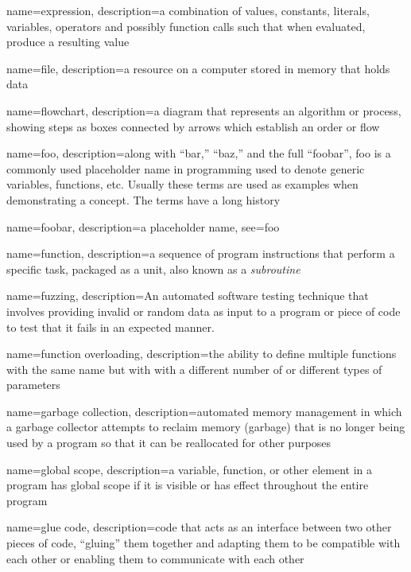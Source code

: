 {
  name=expression,
  description={a combination of values, constants, literals, variables, operators and possibly function calls such that when evaluated, produce a resulting value}
}

{
  name=file,
  description={a resource on a computer stored in memory that holds data}
}

{
  name=flowchart,
  description={a diagram that represents an algorithm or process, showing steps as boxes connected by arrows which establish an
  order or flow}
}

{
  name=foo,
  description={along with ``bar,'' ``baz,'' and the full ``foobar'', foo is a commonly used placeholder name in programming used to denote generic variables, functions, etc. Usually these terms are used as examples when demonstrating a concept.  The terms have a long history \cite{DBLP:journals/rfc/rfc3092}}
}


{
  name=foobar,
  description={a placeholder name},
  see={foo}
}

{
  name=function,
  description={a sequence of program instructions that perform a specific task, packaged as a unit, also
  known as a \emph{subroutine}}
}

{
  name=fuzzing,
  description={An automated software testing technique that involves providing invalid or random data as input to a program or piece of code to test that it fails in an expected manner.}
}

{
  name=function overloading,
  description={the ability to define multiple functions with the same name but with with a different number of or different types of parameters}
}

{
  name=garbage collection,
  description={automated memory management in which a garbage collector attempts to reclaim memory (garbage) that is no
	longer being used by a program so that it can be reallocated for other purposes}
}

{
  name=global scope,
  description={a variable, function, or other element in a program has global scope if it is visible or has effect throughout
  	the entire program}
}

{
  name=glue code,
  description={code that acts as an interface between two other pieces of code, ``gluing'' them together and adapting them to be compatible with each other or enabling them to communicate with each other}
}

